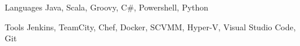 

\begin{cvskills}

  \cvskill
    {Languages} %
    {Java, Scala, Groovy, C\#, Powershell, Python} %
  
  \cvskill
    {Tools} %
    {Jenkins, TeamCity, Chef, Docker, SCVMM, Hyper-V, Visual Studio Code, Git} %

\end{cvskills}
